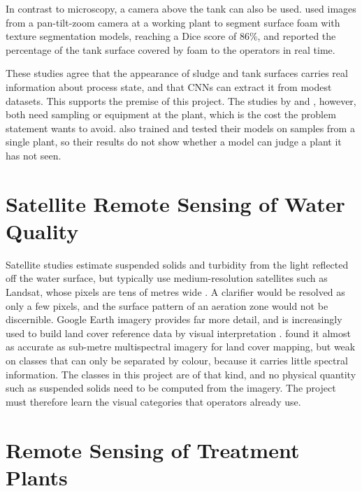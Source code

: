 In contrast to microscopy, a camera above the tank can also be used. \citet{carballomato2024} used images from a pan-tilt-zoom camera at a working plant to segment surface foam with texture segmentation models, reaching a Dice score of 86\%, and reported the percentage of the tank surface covered by foam to the operators in real time.

These studies agree that the appearance of sludge and tank surfaces carries real information about process state, and that CNNs can extract it from modest datasets. This supports the premise of this project. The studies by \citet{borzooei2024} and \citet{carballomato2024}, however, both need sampling or equipment at the plant, which is the cost the problem statement wants to avoid. \citet{borzooei2024} also trained and tested their models on samples from a single plant, so their results do not show whether a model can judge a plant it has not seen.

\section{Satellite Remote Sensing of Water Quality}
\label{sec:rs_water_quality}

Satellite studies estimate suspended solids and turbidity from the light reflected off the water surface, but typically use medium-resolution satellites such as Landsat, whose pixels are tens of metres wide \citep{gholizadeh2016}. A clarifier would be resolved as only a few pixels, and the surface pattern of an aeration zone would not be discernible. Google Earth imagery provides far more detail, and is increasingly used to build land cover reference data by visual interpretation \citep{lesiv2018}. \citet{hu2013} found it almost as accurate as sub-metre multispectral imagery for land cover mapping, but weak on classes that can only be separated by colour, because it carries little spectral information. The classes in this project are of that kind, and no physical quantity such as suspended solids need to be computed from the imagery. The project must therefore learn the visual categories that operators already use.

\section{Remote Sensing of Treatment Plants}
\label{sec:rs_treatment_plants}

